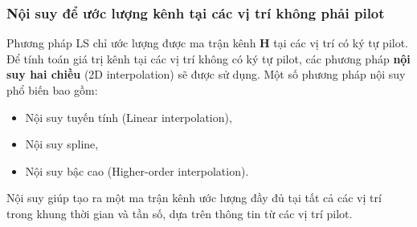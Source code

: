 \subsubsection{Nội suy để ước lượng kênh tại các vị trí không phải pilot}

Phương pháp LS chỉ ước lượng được ma trận kênh \( \bm{H} \) tại các vị trí có ký tự pilot. 
Để tính toán giá trị kênh tại các vị trí không có ký tự pilot, các phương pháp \textbf{nội suy hai chiều} (2D interpolation) sẽ được sử dụng. 
Một số phương pháp nội suy phổ biến bao gồm:

\begin{itemize}
    \item Nội suy tuyến tính (Linear interpolation),
    \item Nội suy spline,
    \item Nội suy bậc cao (Higher-order interpolation).
\end{itemize}

Nội suy giúp tạo ra một ma trận kênh ước lượng đầy đủ tại tất cả các vị trí trong khung thời gian và tần số, dựa trên thông tin từ các vị trí pilot.